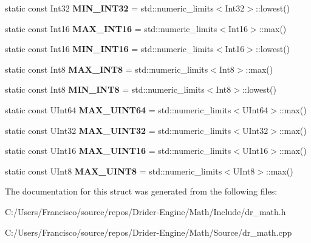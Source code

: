 \begin{DoxyCompactItemize}
static const Int32 {\bfseries M\+I\+N\+\_\+\+I\+N\+T32} = std\+::numeric\+\_\+limits$<$Int32$>$\+::lowest()
\item 
\mbox{\label{structdrider_s_d_k_1_1_math_a336095542b6cae75a45de853acdaad02}} 
static const Int16 {\bfseries M\+A\+X\+\_\+\+I\+N\+T16} = std\+::numeric\+\_\+limits$<$Int16$>$\+::max()
\item 
\mbox{\label{structdrider_s_d_k_1_1_math_ad2abc58155e75f0865109e7e9dc313ad}} 
static const Int16 {\bfseries M\+I\+N\+\_\+\+I\+N\+T16} = std\+::numeric\+\_\+limits$<$Int16$>$\+::lowest()
\item 
\mbox{\label{structdrider_s_d_k_1_1_math_a745a33f2f96f0bdb3e210697dc2ac0ee}} 
static const Int8 {\bfseries M\+A\+X\+\_\+\+I\+N\+T8} = std\+::numeric\+\_\+limits$<$Int8$>$\+::max()
\item 
\mbox{\label{structdrider_s_d_k_1_1_math_a2518af712142b016edc781d114e6c89a}} 
static const Int8 {\bfseries M\+I\+N\+\_\+\+I\+N\+T8} = std\+::numeric\+\_\+limits$<$Int8$>$\+::lowest()
\item 
\mbox{\label{structdrider_s_d_k_1_1_math_a5573b91b81902a305dea8a163d226cc4}} 
static const U\+Int64 {\bfseries M\+A\+X\+\_\+\+U\+I\+N\+T64} = std\+::numeric\+\_\+limits$<$U\+Int64$>$\+::max()
\item 
\mbox{\label{structdrider_s_d_k_1_1_math_ade9d4d8ef05e6da8936a00331441e33a}} 
static const U\+Int32 {\bfseries M\+A\+X\+\_\+\+U\+I\+N\+T32} = std\+::numeric\+\_\+limits$<$U\+Int32$>$\+::max()
\item 
\mbox{\label{structdrider_s_d_k_1_1_math_ac7880b3fd1d6b3c372b8c4ef0547a2f8}} 
static const U\+Int16 {\bfseries M\+A\+X\+\_\+\+U\+I\+N\+T16} = std\+::numeric\+\_\+limits$<$U\+Int16$>$\+::max()
\item 
\mbox{\label{structdrider_s_d_k_1_1_math_a866c799bafdcfe99ec90952a25688a67}} 
static const U\+Int8 {\bfseries M\+A\+X\+\_\+\+U\+I\+N\+T8} = std\+::numeric\+\_\+limits$<$U\+Int8$>$\+::max()
\end{DoxyCompactItemize}


The documentation for this struct was generated from the following files\+:\begin{DoxyCompactItemize}
\item 
C\+:/\+Users/\+Francisco/source/repos/\+Drider-\/\+Engine/\+Math/\+Include/dr\+\_\+math.\+h\item 
C\+:/\+Users/\+Francisco/source/repos/\+Drider-\/\+Engine/\+Math/\+Source/dr\+\_\+math.\+cpp\end{DoxyCompactItemize}

